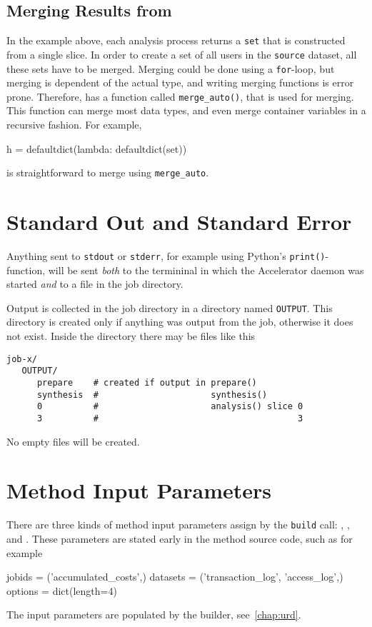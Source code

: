 \subsection{Merging Results from \analysis}
In the example above, each analysis process returns a \texttt{set}
that is constructed from a single slice.  In order to create a set of
all users in the \texttt{source} dataset, all these sets have to be
merged.  Merging could be done using a \texttt{for}-loop, but merging
is dependent of the actual type, and writing merging functions is
error prone.  Therefore, \analysisres has a function called
\texttt{merge\_auto()}, that is used for merging.  This function can
merge most data types, and even merge container variables in a
recursive fashion.  For example,
\begin{python}
h = defaultdict(lambda: defaultdict(set))
\end{python}
is straightforward to merge using \texttt{merge\_auto}.



\section{Standard Out and Standard Error}
\label{sec:OUTPUT}

Anything sent to \texttt{stdout} or \texttt{stderr}, for example using
Python's \texttt{print()}-function, will be sent \textsl{both} to the
termininal in which the Accelerator daemon was started \textsl{and} to
a file in the job directory.

Output is collected in the job directory in a directory named
\texttt{OUTPUT}.  This directory is created only if anything was
output from the job, otherwise it does not exist.  Inside the
directory there may be files like this
\begin{verbatim}
job-x/
   OUTPUT/
      prepare    # created if output in prepare()
      synthesis  #                      synthesis()
      0          #                      analysis() slice 0
      3          #                                       3
\end{verbatim}
No empty files will be created.



\section{Method Input Parameters}
\label{sec:input_params}

There are three kinds of method input parameters assign by
the \texttt{build} call: \jobids, \datasets, and \options.  These
parameters are stated early in the method source code, such as for
example
\begin{python}
jobids = ('accumulated_costs',)
datasets = ('transaction_log', 'access_log',)
options = dict(length=4)
\end{python}
The input parameters are populated by the
builder, see~\ref{chap:urd}.

